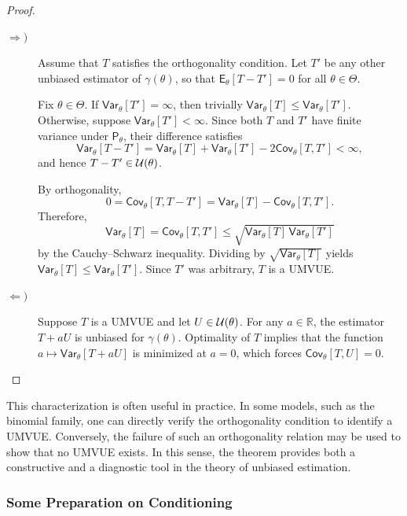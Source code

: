 \begin{proof}
\leavevmode
\begin{description}
\item[\(\Longrightarrow)\)]
Assume that \(T\) satisfies the orthogonality condition.
Let \(T'\) be any other unbiased estimator of \(\gamma(\theta)\), so that
\(\mathsf{E}_{\theta}[T-T']=0\) for all \(\theta\in\Theta\).

Fix \(\theta\in\Theta\).
If \(\mathsf{Var}_{\theta}[T']=\infty\), then trivially
\(\mathsf{Var}_{\theta}[T]\le \mathsf{Var}_{\theta}[T']\).
Otherwise, suppose \(\mathsf{Var}_{\theta}[T']<\infty\).
Since both \(T\) and \(T'\) have finite variance under \(\mathsf{P}_{\theta}\),
their difference satisfies
\[
    \mathsf{Var}_{\theta}[T-T']
    =
    \mathsf{Var}_{\theta}[T]
    +
    \mathsf{Var}_{\theta}[T']
    -
    2\mathsf{Cov}_{\theta}[T,T']
    < \infty,
\]
and hence \(T-T' \in \mathcal{U}(\theta)\).

By orthogonality,
\[
    0
    =
    \mathsf{Cov}_{\theta}[T,T-T']
    =
    \mathsf{Var}_{\theta}[T]
    -
    \mathsf{Cov}_{\theta}[T,T'].
\]
Therefore,
\[
    \mathsf{Var}_{\theta}[T]
    =
    \mathsf{Cov}_{\theta}[T,T']
    \le
    \sqrt{\mathsf{Var}_{\theta}[T]\,
          \mathsf{Var}_{\theta}[T']}
\]
by the Cauchy--Schwarz inequality.
Dividing by \(\sqrt{\mathsf{Var}_{\theta}[T]}\) yields
\(
\mathsf{Var}_{\theta}[T]
\le
\mathsf{Var}_{\theta}[T'].
\)
Since \(T'\) was arbitrary, \(T\) is a UMVUE.

\item[\(\Longleftarrow)\)]
Suppose \(T\) is a UMVUE and let \(U \in \mathcal{U}(\theta)\).
For any \(a \in \mathbb{R}\), the estimator \(T+aU\) is unbiased for
\(\gamma(\theta)\).
Optimality of \(T\) implies that the function
\(a \mapsto \mathsf{Var}_{\theta}[T+aU]\) is minimized at \(a=0\),
which forces
\(
\mathsf{Cov}_{\theta}[T,U]=0.
\)
\end{description}
\end{proof}

This characterization is often useful in practice.
In some models, such as the binomial family, one can directly verify the orthogonality
condition to identify a UMVUE.
Conversely, the failure of such an orthogonality relation may be used to show that no
UMVUE exists.
In this sense, the theorem provides both a constructive and a diagnostic tool in the
theory of unbiased estimation.

\subsubsection*{Some Preparation on Conditioning}%
\label{ssub:spc}

